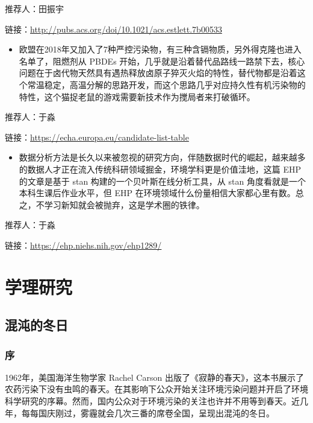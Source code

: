 \documentclass[]{book}
\providecommand{\tightlist}{%
  \setlength{\itemsep}{0pt}\setlength{\parskip}{0pt}}
\begin{document}
推荐人：田振宇

链接：\url{http://pubs.acs.org/doi/10.1021/acs.estlett.7b00533}

\begin{itemize}
\tightlist
\item
  欧盟在2018年又加入了7种严控污染物，有三种含镉物质，另外得克隆也进入名单了，阻燃剂从
  PBDEs
  开始，几乎就是沿着替代品路线一路禁下去，核心问题在于卤代物天然具有遇热释放卤原子猝灭火焰的特性，替代物都是沿着这个常温稳定，高温分解的思路开发，而这个思路几乎对应持久性有机污染物的特性，这个猫捉老鼠的游戏需要新技术作为搅局者来打破循环。
\end{itemize}

推荐人：于淼

链接：\url{https://echa.europa.eu/candidate-list-table}

\begin{itemize}
\tightlist
\item
  数据分析方法是长久以来被忽视的研究方向，伴随数据时代的崛起，越来越多的数据人才正在流入传统科研领域掘金，环境学科更是价值洼地，这篇
  EHP 的文章是基于 stan 构建的一个贝叶斯在线分析工具，从 stan
  角度看就是一个本科生课后作业水平，但 EHP
  在环境领域什么份量相信大家都心里有数。总之，不学习新知就会被抛弃，这是学术圈的铁律。
\end{itemize}

推荐人：于淼

链接：\url{https://ehp.niehs.nih.gov/ehp1289/}

\chapter{学理研究}

\section{混沌的冬日}

\subsection{序}

1962年，美国海洋生物学家 Rachel Carson
出版了《寂静的春天》，这本书展示了农药污染下没有虫鸣的春天。在其影响下公众开始关注环境污染问题并开启了环境科学研究的序幕。然而，国内公众对于环境污染的关注也许并不用等到春天。近几年，每每国庆刚过，雾霾就会几次三番的席卷全国，呈现出混沌的冬日。
\end{document}
